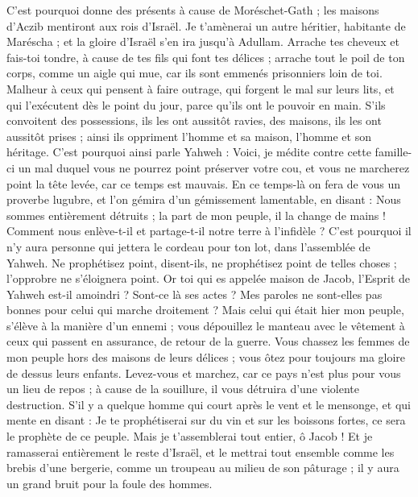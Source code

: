 \begin{multicols}{2}
C'est pourquoi donne des présents à cause de Moréschet-Gath ; les maisons d'Aczib mentiront aux rois d'Israël.
Je t’amènerai un autre héritier, habitante de Maréscha ; et la gloire d'Israël s'en ira jusqu'à Adullam.
Arrache tes cheveux et fais-toi tondre, à cause de tes fils qui font tes délices ; arrache tout le poil de ton corps, comme un aigle qui mue, car ils sont emmenés prisonniers loin de toi.
\VerseOne{}Malheur à ceux qui pensent à faire outrage, qui forgent le mal sur leurs lits, et qui l'exécutent dès le point du jour, parce qu'ils ont le pouvoir en main.
S'ils convoitent des possessions, ils les ont aussitôt ravies, des maisons, ils les ont aussitôt prises ; ainsi ils oppriment l'homme et sa maison, l'homme et son héritage.
C'est pourquoi ainsi parle Yahweh : Voici, je médite contre cette famille-ci un mal duquel vous ne pourrez point préserver votre cou, et vous ne marcherez point la tête levée, car ce temps est mauvais.
En ce temps-là on fera de vous un proverbe lugubre, et l'on gémira d'un gémissement lamentable, en disant : Nous sommes entièrement détruits ; la part de mon peuple, il la change de mains ! Comment nous enlève-t-il et partage-t-il notre terre à l'infidèle ?
C'est pourquoi il n'y aura personne qui jettera le cordeau pour ton lot, dans l'assemblée de Yahweh.
Ne prophétisez point, disent-ils, ne prophétisez point de telles choses ; l'opprobre ne s'éloignera point.
Or toi qui es appelée maison de Jacob, l'Esprit de Yahweh est-il amoindri ? Sont-ce là ses actes ? Mes paroles ne sont-elles pas bonnes pour celui qui marche droitement ?
Mais celui qui était hier mon peuple, s'élève à la manière d'un ennemi ; vous dépouillez le manteau avec le vêtement à ceux qui passent en assurance, de retour de la guerre.
Vous chassez les femmes de mon peuple hors des maisons de leurs délices ; vous ôtez pour toujours ma gloire de dessus leurs enfants.
Levez-vous et marchez, car ce pays n'est plus pour vous un lieu de repos ; à cause de la souillure, il vous détruira d’une violente destruction.
S'il y a quelque homme qui court après le vent et le mensonge, et qui mente en disant : Je te prophétiserai sur du vin et sur les boissons fortes, ce sera le prophète de ce peuple.
Mais je t'assemblerai tout entier, ô Jacob ! Et je ramasserai entièrement le reste d'Israël, et le mettrai tout ensemble comme les brebis d'une bergerie, comme un troupeau au milieu de son pâturage ; il y aura un grand bruit pour la foule des hommes.

\end{multicols}
